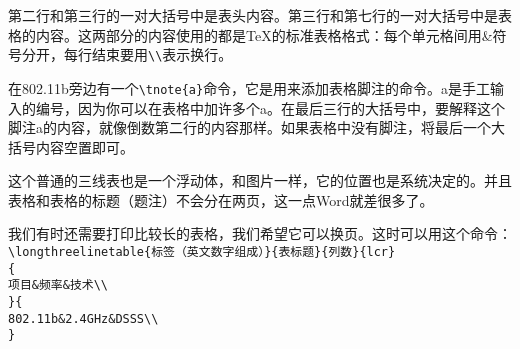 第二行和第三行的一对大括号中是表头内容。第三行和第七行的一对大括号中是表格的内容。这两部分的内容使用的都是TeX的标准表格格式：每个单元格间用\&符号分开，每行结束要用\verb|\\|表示换行。

在802.11b旁边有一个\verb|\tnote{a}|命令，它是用来添加表格脚注的命令。a是手工输入的编号，因为你可以在表格中加许多个a。在最后三行的大括号中，要解释这个脚注a的内容，就像倒数第二行的内容那样。如果表格中没有脚注，将最后一个大括号内容空置即可。

这个普通的三线表也是一个浮动体，和图片一样，它的位置也是系统决定的。并且表格和表格的标题（题注）不会分在两页，这一点Word就差很多了。

我们有时还需要打印比较长的表格，我们希望它可以换页。这时可以用这个命令：\\
\verb|\longthreelinetable{标签（英文数字组成）}{表标题}{列数}{lcr}|\\
\verb|{|\\
\verb|项目&频率&技术\\|\\
\verb|}{|\\
\verb|802.11b&2.4GHz&DSSS\\|\\
\verb|}|\par
{}
